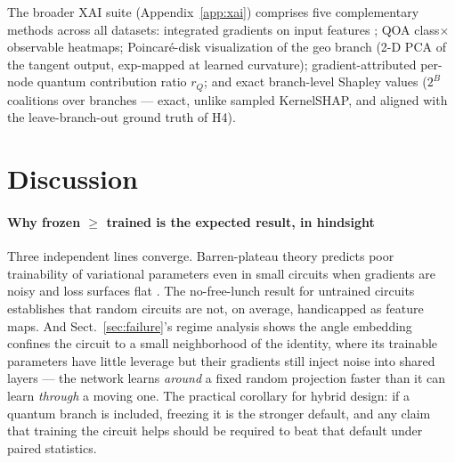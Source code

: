 \documentclass[pdflatex,sn-mathphys-num]{sn-jnl}
\begin{document}
The broader XAI suite (Appendix~\ref{app:xai}) comprises five complementary methods across all datasets: integrated gradients on input features \cite{sundararajan2017ig}; QOA class$\times$observable heatmaps; Poincar\'e-disk visualization of the geo branch (2-D PCA of the tangent output, exp-mapped at learned curvature); gradient-attributed per-node quantum contribution ratio $r_Q$; and exact branch-level Shapley values \cite{shapley1953,lundberg2017shap} ($2^B$ coalitions over branches --- exact, unlike sampled KernelSHAP, and aligned with the leave-branch-out ground truth of H4).

\section{Discussion}\label{sec:discussion}

\paragraph{Why frozen $\ge$ trained is the expected result, in hindsight} Three independent lines converge. Barren-plateau theory predicts poor trainability of variational parameters even in small circuits when gradients are noisy and loss surfaces flat \cite{larocca2025barren}. The no-free-lunch result for untrained circuits \cite{herbert2023nfl} establishes that random circuits are not, on average, handicapped as feature maps. And Sect.~\ref{sec:failure}'s regime analysis shows the angle embedding confines the circuit to a small neighborhood of the identity, where its trainable parameters have little leverage but their gradients still inject noise into shared layers --- the network learns \emph{around} a fixed random projection faster than it can learn \emph{through} a moving one. The practical corollary for hybrid design: if a quantum branch is included, freezing it is the stronger default, and any claim that training the circuit helps should be required to beat that default under paired statistics.
\end{document}
